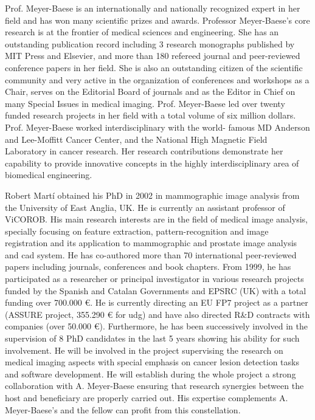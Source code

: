 Prof. Meyer-Baese is an internationally and nationally recognized expert in her field and has won many scientific prizes and awards. Professor Meyer-Baese's core research is at the frontier of medical sciences and engineering. She has an outstanding publication record including 3 research monographs published by MIT Press and Elsevier, and more than 180 refereed journal and peer-reviewed conference papers in her field. She is also an outstanding citizen of the scientific community and very active in the organization of conferences and workshops as a Chair, serves on the Editorial Board of journals and as the Editor in Chief on many Special Issues in medical imaging. Prof. Meyer-Baese led over twenty funded research projects in her field with a total volume of six million dollars. Prof. Meyer-Baese worked interdisciplinary with the world- famous MD Anderson and Lee-Moffitt Cancer Center, and the National High Magnetic Field Laboratory in cancer research. Her research contributions demonstrate her capability to provide innovative concepts in the highly interdisciplinary area of biomedical engineering.

Robert Mart\'i obtained his PhD in 2002 in mammographic image analysis from the University of East Anglia, UK. He is currently an assistant professor of ViCOROB. His main research interests are in the field of medical image analysis, specially focusing on feature extraction, pattern-recognition and image registration and its application to mammographic and prostate image analysis and \ac{cad} system. He has co-authored more than 70 international peer-reviewed papers including journals, conferences and book chapters. From 1999, he has participated as a researcher or principal investigator in various research projects funded by the Spanish and Catalan Governments and EPSRC (UK) with a total funding over 700.000 \euro{}. He is currently directing an EU FP7 project as a partner (ASSURE project, 355.290 \euro{} for \ac{udg}) and have also directed R\&D contracts with companies (over 50.000 \euro{}).
Furthermore, he has been successively involved in the supervision of 8 PhD candidates in the last 5 years showing his ability for such involvement.
He will be involved in the project supervising the research on medical imaging aspects with special emphasis on cancer lesion detection tasks and software development.
He will establish during the whole project a strong collaboration with A. Meyer-Baese ensuring that research synergies between the host and beneficiary are properly carried out. 
His expertise complements A. Meyer-Baese's and the fellow can profit from this constellation.

